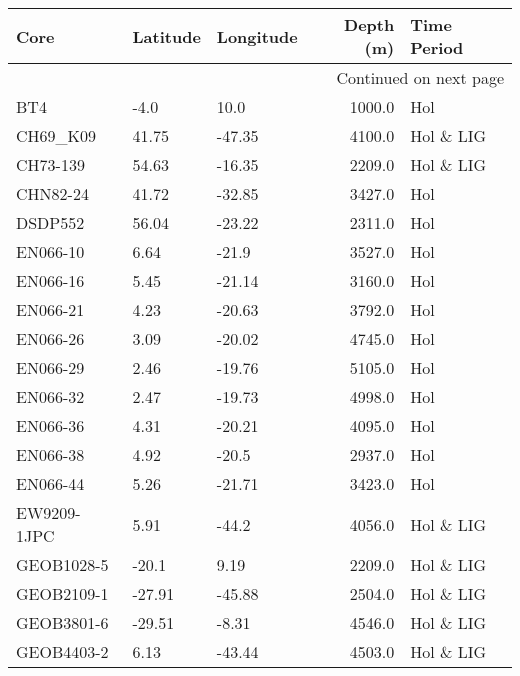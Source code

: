 \begin{longtable}{lllrl}

             Core & Latitude & Longitude &  Depth (m) & Time Period \\

\endhead

\multicolumn{5}{r}{{Continued on next page}} \\

\endfoot


\endlastfoot
              BT4 &     -4.0 &      10.0 &     1000.0 &         Hol \\
         CH69\_K09 &    41.75 &    -47.35 &     4100.0 &   Hol \& LIG \\
         CH73-139 &    54.63 &    -16.35 &     2209.0 &   Hol \& LIG \\
         CHN82-24 &    41.72 &    -32.85 &     3427.0 &         Hol \\
          DSDP552 &    56.04 &    -23.22 &     2311.0 &         Hol \\
         EN066-10 &     6.64 &     -21.9 &     3527.0 &         Hol \\
         EN066-16 &     5.45 &    -21.14 &     3160.0 &         Hol \\
         EN066-21 &     4.23 &    -20.63 &     3792.0 &         Hol \\
         EN066-26 &     3.09 &    -20.02 &     4745.0 &         Hol \\
         EN066-29 &     2.46 &    -19.76 &     5105.0 &         Hol \\
         EN066-32 &     2.47 &    -19.73 &     4998.0 &         Hol \\
         EN066-36 &     4.31 &    -20.21 &     4095.0 &         Hol \\
         EN066-38 &     4.92 &     -20.5 &     2937.0 &         Hol \\
         EN066-44 &     5.26 &    -21.71 &     3423.0 &         Hol \\
      EW9209-1JPC &     5.91 &     -44.2 &     4056.0 &   Hol \& LIG \\
       GEOB1028-5 &    -20.1 &      9.19 &     2209.0 &   Hol \& LIG \\
       GEOB2109-1 &   -27.91 &    -45.88 &     2504.0 &   Hol \& LIG \\
       GEOB3801-6 &   -29.51 &     -8.31 &     4546.0 &   Hol \& LIG \\
       GEOB4403-2 &     6.13 &    -43.44 &     4503.0 &   Hol \& LIG \\

\end{longtable}
